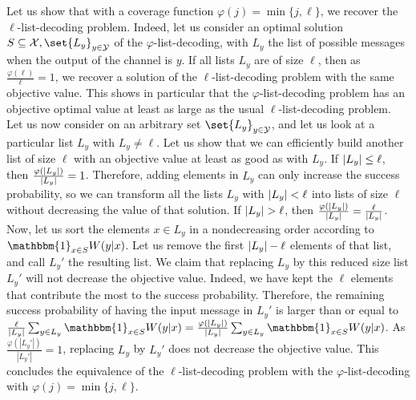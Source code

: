 Let us show that with a coverage function $\varphi(j) = \min\{ j,\ell\}$, we recover the $\ell$-list-decoding problem. Indeed, let us consider an optimal solution $S \subseteq \mathcal{X},\set{L_y}_{y \in \mathcal{Y}}$ of the $\varphi$-list-decoding, with $L_y$ the list of possible messages when the output of the channel is $y$. If all lists $L_y$ are of size $\ell$, then as $\frac{\varphi(\ell)}{\ell} = 1$, we recover a solution of the $\ell$-list-decoding problem with the same objective value. This shows in particular that the $\varphi$-list-decoding problem has an objective optimal value at least as large as the usual $\ell$-list-decoding problem. Let us now consider on an arbitrary set $\set{L_y}_{y \in \mathcal{Y}}$, and let us look at a particular list $L_y$ with $L_y \not= \ell$. Let us show that we can efficiently build another list of size $\ell$ with an objective value at least as good as with $L_y$. If $\abs{L_y} \leq \ell$, then $\frac{\varphi(\abs{L_y})}{\abs{L_y}} = 1$. Therefore, adding elements in $L_y$ can only increase the success probability, so we can transform all the lists $L_y$ with $\abs{L_y} < \ell$ into lists of size $\ell$ without decreasing the value of that solution. If $\abs{L_y} > \ell$, then $\frac{\varphi(\abs{L_y})}{\abs{L_y}} = \frac{\ell}{\abs{L_y}}$. Now, let us sort the elements $x \in L_y$ in a nondecreasing order according to $\mathbbm{1}_{x \in S}W(y|x)$. Let us remove the first $\abs{L_y} - \ell$ elements of that list, and call $L_y'$ the resulting list. We claim that replacing $L_y$ by this reduced size list $L_y'$ will not decrease the objective value. Indeed, we have kept the $\ell$ elements that contribute the most to the success probability. Therefore, the remaining success probability of having the input message in $L_y'$ is larger than or equal to $\frac{\ell}{\abs{L_y}}\sum_{y \in L_y}\mathbbm{1}_{x \in S}W(y|x) = \frac{\varphi(\abs{L_y})}{\abs{L_y}}\sum_{y \in L_y}\mathbbm{1}_{x \in S}W(y|x)$.  As $\frac{\varphi(|L_y'|)}{|L_y'|} = 1$, replacing $L_y$ by $L_y'$ does not decrease the objective value. This concludes the equivalence of the $\ell$-list-decoding problem with the $\varphi$-list-decoding with $\varphi(j) = \min\{ j,\ell\}$.

